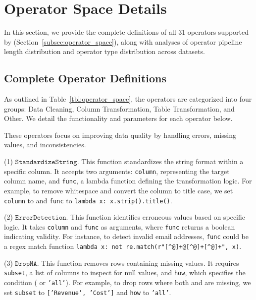 
\section{Operator Space Details}
\label{sec:appendix_operator_space}

In this section, we provide the complete definitions of all 31 operators supported by \sys (Section~\ref{subsec:operator_space}), along with analyses of operator pipeline length distribution and operator type distribution across datasets.

\subsection{Complete Operator Definitions}
\label{subsec:appendix_operator_definitions}



As outlined in Table~\ref{tbl:operator_space}, the operators are categorized into four groups: Data Cleaning, Column Transformation, Table Transformation, and Other. We detail the functionality and parameters for each operator below.

These operators focus on improving data quality by handling errors, missing values, and inconsistencies.

(1) $\mathtt{StandardizeString}$.
    This function standardizes the string format within a specific column. It accepts two arguments: {\small\texttt{column}}, representing the target column name, and {\small\texttt{func}}, a lambda function defining the transformation logic. For example, to remove whitespace and convert the  column to title case, we set {\small\texttt{column}} to  and {\small\texttt{func}} to {\small\texttt{lambda x: x.strip().title()}}.

(2) $\mathtt{ErrorDetection}$.
    This function identifies erroneous values based on specific logic. It takes {\small\texttt{column}} and {\small\texttt{func}} as arguments, where {\small\texttt{func}} returns a boolean indicating validity. For instance, to detect invalid email addresses, {\small\texttt{func}} could be a regex match function {\small\texttt{lambda x: not re.match(r"[\^{}@]+@[\^{}@]+\.[\^{}@]+", x)}}.

(3) $\mathtt{DropNA}$.
    This function removes rows containing missing values. It requires {\small\texttt{subset}}, a list of columns to inspect for null values, and {\small\texttt{how}}, which specifies the condition ( or {\small\texttt{'all'}}). For example, to drop rows where both  and  are missing, we set {\small\texttt{subset}} to {\small\texttt{['Revenue', 'Cost']}} and {\small\texttt{how}} to {\small\texttt{'all'}}.


